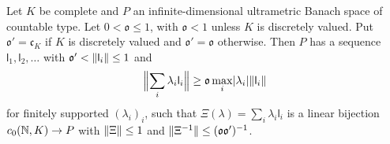\begin{lemma}[bases]\label{dp:lem:basis}
Let $K$ be complete and $P$ an infinite-dimensional ultrametric Banach space of countable type. Let $0<\mathfrak o\le1$, with $\mathfrak o<1$ unless $K$ is discretely valued. Put $\mathfrak o'=\mathfrak c_K$ if $K$ is discretely valued and $\mathfrak o'=\mathfrak o$ otherwise. Then $P$ has a sequence $\mathsf l_1,\mathsf l_2,\dots$ with $\mathfrak o'<\lVert \mathsf l_i\rVert\le1$ and
\begin{equation}\label{dp:agr:eq:orthogonal}
 \Bigl\lVert\sum_i\lambda_i\mathsf l_i\Bigr\rVert\ge\mathfrak o\max_i\lvert \lambda_i\rvert\lVert \mathsf l_i\rVert
\end{equation}
for finitely supported $(\lambda_i)_i$, such that $\Xi(\lambda)=\sum_i\lambda_i\mathsf l_i$ is a linear bijection $c_0(\mathbb N,K)\to P$ with $\lVert \Xi\rVert\le1$ and $\lVert \Xi^{-1}\rVert\le(\mathfrak o\mathfrak o')^{-1}$.
\end{lemma}

